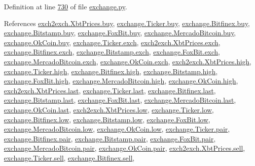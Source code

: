 Definition at line \hyperlink{exchange_8py_source_l00730}{730} of file \hyperlink{exchange_8py_source}{exchange.\+py}.



References \hyperlink{exch2exch_8py_source_l00059}{exch2exch.\+Xbt\+Prices.\+buy}, \hyperlink{exchange_8py_source_l00060}{exchange.\+Ticker.\+buy}, \hyperlink{exchange_8py_source_l00430}{exchange.\+Bitfinex.\+buy}, \hyperlink{exchange_8py_source_l00502}{exchange.\+Bitstamp.\+buy}, \hyperlink{exchange_8py_source_l00574}{exchange.\+Fox\+Bit.\+buy}, \hyperlink{exchange_8py_source_l00642}{exchange.\+Mercado\+Bitcoin.\+buy}, \hyperlink{exchange_8py_source_l00707}{exchange.\+Ok\+Coin.\+buy}, \hyperlink{exchange_8py_source_l00057}{exchange.\+Ticker.\+exch}, \hyperlink{exch2exch_8py_source_l00064}{exch2exch.\+Xbt\+Prices.\+exch}, \hyperlink{exchange_8py_source_l00424}{exchange.\+Bitfinex.\+exch}, \hyperlink{exchange_8py_source_l00499}{exchange.\+Bitstamp.\+exch}, \hyperlink{exchange_8py_source_l00567}{exchange.\+Fox\+Bit.\+exch}, \hyperlink{exchange_8py_source_l00639}{exchange.\+Mercado\+Bitcoin.\+exch}, \hyperlink{exchange_8py_source_l00704}{exchange.\+Ok\+Coin.\+exch}, \hyperlink{exch2exch_8py_source_l00061}{exch2exch.\+Xbt\+Prices.\+high}, \hyperlink{exchange_8py_source_l00062}{exchange.\+Ticker.\+high}, \hyperlink{exchange_8py_source_l00432}{exchange.\+Bitfinex.\+high}, \hyperlink{exchange_8py_source_l00504}{exchange.\+Bitstamp.\+high}, \hyperlink{exchange_8py_source_l00576}{exchange.\+Fox\+Bit.\+high}, \hyperlink{exchange_8py_source_l00644}{exchange.\+Mercado\+Bitcoin.\+high}, \hyperlink{exchange_8py_source_l00709}{exchange.\+Ok\+Coin.\+high}, \hyperlink{exch2exch_8py_source_l00063}{exch2exch.\+Xbt\+Prices.\+last}, \hyperlink{exchange_8py_source_l00064}{exchange.\+Ticker.\+last}, \hyperlink{exchange_8py_source_l00434}{exchange.\+Bitfinex.\+last}, \hyperlink{exchange_8py_source_l00506}{exchange.\+Bitstamp.\+last}, \hyperlink{exchange_8py_source_l00578}{exchange.\+Fox\+Bit.\+last}, \hyperlink{exchange_8py_source_l00646}{exchange.\+Mercado\+Bitcoin.\+last}, \hyperlink{exchange_8py_source_l00711}{exchange.\+Ok\+Coin.\+last}, \hyperlink{exch2exch_8py_source_l00062}{exch2exch.\+Xbt\+Prices.\+low}, \hyperlink{exchange_8py_source_l00063}{exchange.\+Ticker.\+low}, \hyperlink{exchange_8py_source_l00433}{exchange.\+Bitfinex.\+low}, \hyperlink{exchange_8py_source_l00505}{exchange.\+Bitstamp.\+low}, \hyperlink{exchange_8py_source_l00577}{exchange.\+Fox\+Bit.\+low}, \hyperlink{exchange_8py_source_l00645}{exchange.\+Mercado\+Bitcoin.\+low}, \hyperlink{exchange_8py_source_l00710}{exchange.\+Ok\+Coin.\+low}, \hyperlink{exchange_8py_source_l00058}{exchange.\+Ticker.\+pair}, \hyperlink{exchange_8py_source_l00425}{exchange.\+Bitfinex.\+pair}, \hyperlink{exchange_8py_source_l00500}{exchange.\+Bitstamp.\+pair}, \hyperlink{exchange_8py_source_l00568}{exchange.\+Fox\+Bit.\+pair}, \hyperlink{exchange_8py_source_l00640}{exchange.\+Mercado\+Bitcoin.\+pair}, \hyperlink{exchange_8py_source_l00705}{exchange.\+Ok\+Coin.\+pair}, \hyperlink{exch2exch_8py_source_l00058}{exch2exch.\+Xbt\+Prices.\+sell}, \hyperlink{exchange_8py_source_l00061}{exchange.\+Ticker.\+sell}, \hyperlink{exchange_8py_source_l00431}{exchange.\+Bitfinex.\+sell}, 